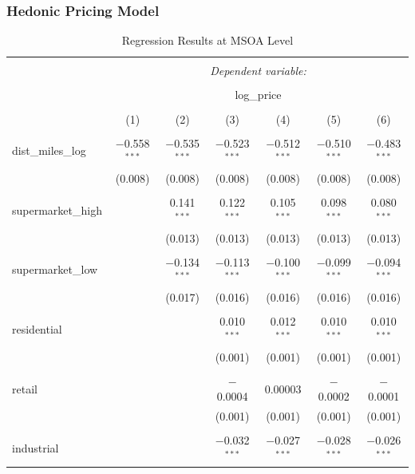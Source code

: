 \documentclass{article}
\begin{document}
\subsubsection{Hedonic Pricing Model}
\begin{table}[H] \centering 
  \caption{Regression Results at MSOA Level} 
  \label{} 
\small 
\begin{tabular}{@{\extracolsep{-5pt}}lcccccc} 
\\[-1.8ex]\hline 
\hline \\[-1.8ex] 
 & \multicolumn{6}{c}{\textit{Dependent variable:}} \\ 
\cline{2-7} 
\\[-1.8ex] & \multicolumn{6}{c}{log\_price} \\ 
\\[-1.8ex] & (1) & (2) & (3) & (4) & (5) & (6)\\ 
\hline \\[-1.8ex] 
 dist\_miles\_log & $-$0.558$^{***}$ & $-$0.535$^{***}$ & $-$0.523$^{***}$ & $-$0.512$^{***}$ & $-$0.510$^{***}$ & $-$0.483$^{***}$ \\ 
  & (0.008) & (0.008) & (0.008) & (0.008) & (0.008) & (0.008) \\ 
  & & & & & & \\ 
 supermarket\_high &  & 0.141$^{***}$ & 0.122$^{***}$ & 0.105$^{***}$ & 0.098$^{***}$ & 0.080$^{***}$ \\ 
  &  & (0.013) & (0.013) & (0.013) & (0.013) & (0.013) \\ 
  & & & & & & \\ 
 supermarket\_low &  & $-$0.134$^{***}$ & $-$0.113$^{***}$ & $-$0.100$^{***}$ & $-$0.099$^{***}$ & $-$0.094$^{***}$ \\ 
  &  & (0.017) & (0.016) & (0.016) & (0.016) & (0.016) \\ 
  & & & & & & \\ 
 residential &  &  & 0.010$^{***}$ & 0.012$^{***}$ & 0.010$^{***}$ & 0.010$^{***}$ \\ 
  &  &  & (0.001) & (0.001) & (0.001) & (0.001) \\ 
  & & & & & & \\ 
 retail &  &  & $-$0.0004 & 0.00003 & $-$0.0002 & $-$0.0001 \\ 
  &  &  & (0.001) & (0.001) & (0.001) & (0.001) \\ 
  & & & & & & \\ 
 industrial &  &  & $-$0.032$^{***}$ & $-$0.027$^{***}$ & $-$0.028$^{***}$ & $-$0.026$^{***}$ \\ 

\end{tabular}
\end{table}
\end{document}
